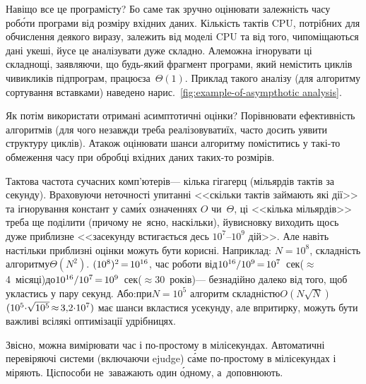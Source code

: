 \documentclass[14pt,a4paper]{extarticle}
\def\dib#1{\,#1\discretionary{}{\mbox{$#1$}}{}\,}
\begin{document}
Навіщо все це програмісту? Бо саме так зручно оцінювати залежність часу роб\'{о}ти програми від розміру вхідних даних. Кількість тактів CPU, потрібних для обчислення деякого виразу, залежить від моделі CPU та від того, чи\nolinebreak[3] поміщаються дані у\nolinebreak[3] кеші, й\nolinebreak[3] усе це аналізувати дуже складно. Але\nolinebreak[3] можна ігнорувати ці складнощі, заявляючи, що будь-який фрагмент програми, який не\nolinebreak[3] містить циклів чи\nolinebreak[3] викликів підпрограм, працює\nolinebreak[1] за~$\Theta(1)$.
Приклад такого аналізу (для алгоритму сортування вставками) наведено на\nolinebreak[3] рис.~\ref{fig:example-of-asympthotic analysis}.

Як потім використати отримані асимптотичні оцінки? Порівнювати ефективність алгоритмів (для чого не\nolinebreak[3] завжди треба реалізовувати\nolinebreak[3] їх, часто досить уявити структуру циклів). А\nolinebreak[3] також оцінювати шанси алгоритму поміститись у такі-то обмеження часу при обробці вхідних даних таких-то розмірів.

Тактова частота сучасних комп'ютерів\nolinebreak[3] --- кілька гігагерц (мільярдів тактів за секунду). Враховуючи неточності у\nolinebreak[3] питанні <<скільки тактів займають які дії>> та ігнорування констант у сам\'{и}х означеннях $O$ чи~$\Theta$, ці <<кілька мільярдів>> треба ще поділити (причому не~ясно, на\nolinebreak[3] скільки), й\nolinebreak[1] у\nolinebreak[3] висновку виходить щось дуже приблизне <<за\nolinebreak[3] секунду встигається десь $10^7$--$10^9$ дій>>. Але навіть настільки приблизні оцінки можуть бути корисні. 
\label{text:first-example-how-to-see-algo-will-not-fit-in-time-limit}
Наприклад: $N{=}10^8$, складність алгоритму\nolinebreak[3] $\Theta(N^2)$. $(10^8)^2\dib{{=}}10^{16}$, час роботи від\nolinebreak[2] $10^{16}/10^9\dib{{=}}10^7$~сек\nolinebreak[2] ($\approx$4~місяці)\linebreak[1] до\nolinebreak[1] $10^{16}/10^7\dib{{=}}10^9$~сек\nolinebreak[2] ($\approx$30~років)\nolinebreak[3] --- безнадійно далеко від того, щоб укластись у пару секунд. Або:\nolinebreak[3] при\nolinebreak[2] $N{=}10^5$ алгоритм складністю\nolinebreak[3] $O(N\sqrt{N})$ $({10^5{\cdot}\sqrt{10^5}}\dib{{\approx}}{3{,}2{\cdot}10^7})$ має шанси вкластися у\nolinebreak[3] секунду, але впритирку, можуть бути важливі всілякі оптимізації у\nolinebreak[3] дрібницях.

Звісно, можна вимірювати час і по-простому в мілісекундах. Автоматичні перевіряючі системи (включаючи ejudge) с\'{а}ме по-простому в мілісекундах і міряють. Ці\nolinebreak[3] способи не~заважають один \'{о}дному, а~доповнюють.
\end{document}
